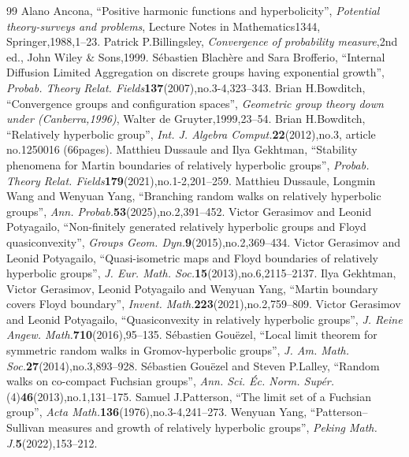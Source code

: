 \documentclass[10pt,a4paper]{amsart}
\theoremstyle{definition}\newtheorem{defi}[theo]{Definition}
\begin{document}
\begin{thebibliography}{99}
 Alano Ancona, ``Positive harmonic functions and hyperbolicity'', \emph{Potential theory-surveys and problems}, Lecture Notes in Mathematics1344, Springer,1988,1--23.
 Patrick P.Billingsley, \emph{Convergence of probability measure},2nd ed., John Wiley \& Sons,1999.
 Sébastien Blachère and Sara Brofferio, ``Internal Diffusion Limited Aggregation on discrete groups having exponential growth'', \emph{Probab. Theory Relat. Fields}\textbf{137}(2007),no.3-4,323--343.
 Brian H.Bowditch, ``Convergence groups and configuration spaces'', \emph{Geometric group theory down under (Canberra,1996)}, Walter de Gruyter,1999,23--54.
 Brian H.Bowditch, ``Relatively hyperbolic group'', \emph{Int. J. Algebra Comput.}\textbf{22}(2012),no.3, article no.1250016 (66pages).
 Matthieu Dussaule and Ilya Gekhtman, ``Stability phenomena for Martin boundaries of relatively hyperbolic groups'', \emph{Probab. Theory Relat. Fields}\textbf{179}(2021),no.1-2,201--259.
 Matthieu Dussaule, Longmin Wang and Wenyuan Yang, ``Branching random walks on relatively hyperbolic groups'', \emph{Ann. Probab.}\textbf{53}(2025),no.2,391--452.
 Victor Gerasimov and Leonid Potyagailo, ``Non-finitely generated relatively hyperbolic groups and Floyd quasiconvexity'', \emph{Groups Geom. Dyn.}\textbf{9}(2015),no.2,369--434.
 Victor Gerasimov and Leonid Potyagailo, ``Quasi-isometric maps and Floyd boundaries of relatively hyperbolic groups'', \emph{J. Eur. Math. Soc.}\textbf{15}(2013),no.6,2115--2137.
 Ilya Gekhtman, Victor Gerasimov, Leonid Potyagailo and Wenyuan Yang, ``Martin boundary covers Floyd boundary'', \emph{Invent. Math.}\textbf{223}(2021),no.2,759--809.
 Victor Gerasimov and Leonid Potyagailo, ``Quasiconvexity in relatively hyperbolic groups'', \emph{J. Reine Angew. Math.}\textbf{710}(2016),95--135.
 Sébastien Gouëzel, ``Local limit theorem for symmetric random walks in Gromov-hyperbolic groups'', \emph{J. Am. Math. Soc.}\textbf{27}(2014),no.3,893--928.
 Sébastien Gouëzel and Steven P.Lalley, ``Random walks on co-compact Fuchsian groups'', \emph{Ann. Sci. Éc. Norm. Supér.}(4)\textbf{46}(2013),no.1,131--175.
 Samuel J.Patterson, ``The limit set of a Fuchsian group'', \emph{Acta Math.}\textbf{136}(1976),no.3-4,241--273.
 Wenyuan Yang, ``Patterson--Sullivan measures and growth of relatively hyperbolic groups'', \emph{Peking Math. J.}\textbf{5}(2022),153--212.
\end{thebibliography}
\end{document}
